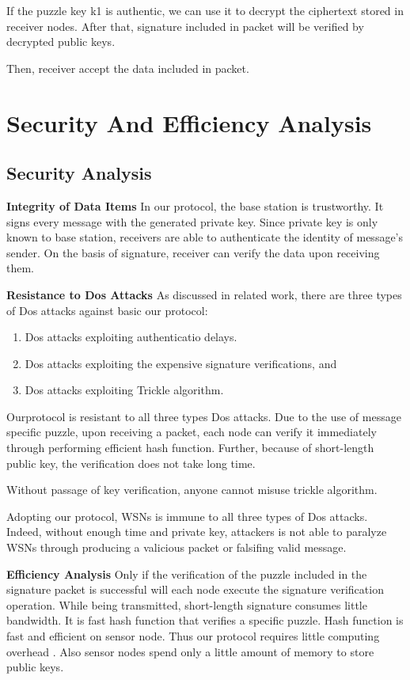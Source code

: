 \documentclass{sig-alternate-05-2015}
\begin{document}
If the puzzle key k1 is authentic, we can use it to decrypt the ciphertext stored in receiver nodes. 
After that, signature included in packet will be verified by decrypted public keys. 

Then, receiver accept the data included in packet.
\section{Security And Efficiency Analysis}
\subsection{Security Analysis}
\textbf{Integrity of Data Items}
In our protocol, the base station is trustworthy. It signs every message with the generated private key. Since private key is only known to base station,  receivers are able to authenticate the identity of message's sender.  On the basis of signature, receiver can verify the data upon receiving them.

\textbf{Resistance to Dos Attacks}
As discussed in related work, there are three types of Dos attacks against basic our protocol:
\begin{enumerate}
\item Dos attacks exploiting authenticatio delays.
\item Dos attacks exploiting the expensive signature verifications, and 
\item Dos attacks exploiting Trickle algorithm.
\end{enumerate}

Ourprotocol is resistant to all three types Dos attacks. Due to the use of message specific puzzle, upon receiving a packet, each node can verify it immediately through performing efficient hash function. Further, because of short-length public key, the verification does not take long time.

 Without passage of key verification, anyone cannot misuse trickle algorithm.
 
   Adopting our protocol, WSNs is immune to all three types of Dos attacks. Indeed, without enough time and private key, attackers is not able to paralyze WSNs through  producing a valicious packet or falsifing valid message.
   
\textbf{Efficiency Analysis}   
    Only if the verification of the puzzle included in the signature packet is successful will each node execute the signature verification operation.
	While being transmitted, short-length signature consumes  little bandwidth. It is fast hash  function that verifies a specific puzzle. Hash function is fast and efficient on sensor node.
	Thus our protocol requires little computing overhead . Also sensor nodes spend only a little amount of memory to store public keys.
	
\end{document}

